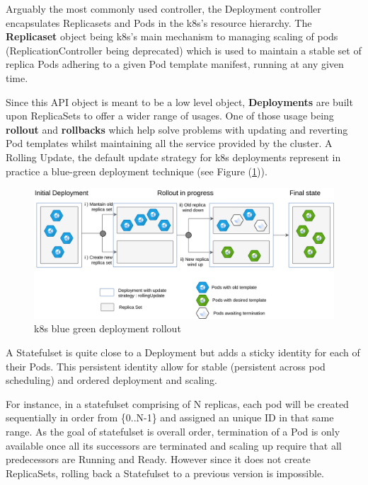 \documentclass[11pt]{article}
\begin{document}

\vspace{-5mm} Arguably the most commonly used controller, the Deployment controller encapsulates Replicasets and Pods in the k8s's resource hierarchy. The \textbf{Replicaset} object being k8s's main mechanism to managing scaling of pods (ReplicationController being deprecated) which is used to maintain a stable set of replica Pods adhering to a given Pod template manifest, running at any given time. 

Since this API object is meant to be a low level object, \textbf{Deployments} are built upon ReplicaSets to offer a wider range of usages. One of those usage being \textbf{rollout} and \textbf{rollbacks} which help solve problems with updating and reverting Pod templates whilst maintaining all the service provided by the cluster. A Rolling Update, the default update strategy for k8s deployments represent in practice a blue-green deployment technique (see Figure (\ref{fig:k8s_rollout})).

\vspace{5mm}
\begin{figure}[h]
    \centering
    \includegraphics[width=\textwidth]{k8s_rollout.png}
    \caption{k8s blue green deployment rollout}
    \label{fig:k8s_rollout}
\end{figure}


\vspace{-5mm} A Statefulset is quite close to a Deployment but adds a sticky identity for each of their Pods. This persistent identity allow for stable (persistent across pod scheduling) and ordered deployment and scaling. 

For instance, in a statefulset comprising of N replicas, each pod will be created sequentially in order from \{0..N-1\} and assigned an unique ID in that same range. As the goal of statefulset is overall order, termination of a Pod is only available once all its successors are terminated and scaling up require that all predecessors are Running and Ready. However since it does not create ReplicaSets, rolling back a Statefulset to a previous version is impossible.
\end{document}
